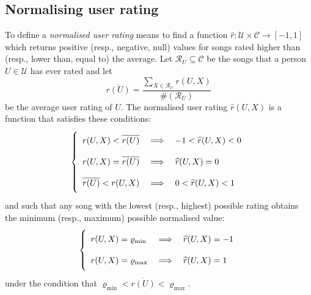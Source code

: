 \subsection{Normalising user rating} %
\label{sub:normalising_user_rating}


To define a \emph{normalised user rating} means to find a function  $\widehat{r}: \mathcal{U} \times \mathcal{C} \to [-1,1]$ which returns positive (resp., negative, null) values for songs rated higher than (resp., lower than, equal to) the average. 
Let $\mathcal{R}_U \subseteq \mathcal{C}$ be the songs that a person $U \in \mathcal{U}$ has ever rated and let
%
\begin{equation*}
   \overline{r(U)} = \frac{\sum_{X \in \mathcal{R}_U} r(U,X)}{\#(\mathcal{R}_U)}       
\end{equation*}
be the average user rating of $U$.
The normalised user rating $\widehat{r}(U,X)$ is a function that satisfies these conditions:
\begin{equation}\label{eq:normalisation_conditions_1}
\left\{ \begin{array}{lll}
\rule[-1em]{0pt}{2.5em}
r(U,X) < \overline{r(U)} & \implies & -1 < \widehat{r}(U,X) < 0 \\
\rule[-1em]{0pt}{2.5em}  
r(U,X) = \overline{r(U)} & \implies & \widehat{r}(U,X) = 0 \\
\rule[-1em]{0pt}{2.5em}  
\overline{r(U)} < r(U,X) & \implies & 0 < \widehat{r}(U,X) < 1
\end{array} \right.
\end{equation}
and such that any song with the lowest (resp., highest) possible rating obtains the minimum (resp., maximum) possible normalised value:
\begin{equation}\label{eq:normalisation_conditions_2}
\left\{ \begin{array}{lll}
\rule[-1em]{0pt}{2.5em}
r(U,X) = \varrho_{\min}  & \implies & \widehat{r}(U,X) = -1 \\ 
\rule[-1em]{0pt}{2.5em}  
r(U,X) = \varrho_{\max} & \implies & \widehat{r}(U,X) = 1%
\end{array} \right.
\end{equation}
under the condition that $\varrho_{\min} < \overline{r(U)} < \varrho_{\max}$.

